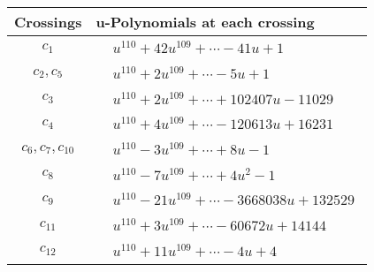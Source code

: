 \documentclass[1p]{elsarticle_modified}
\theoremstyle{definition}
\begin{document}
\begin{tabular}{m{50pt}|m{274pt}}
Crossings & \hspace{64pt}u-Polynomials at each crossing \\
\hline $$\begin{aligned}c_{1}\end{aligned}$$&$\begin{aligned}
&u^{110}+42 u^{109}+\cdots-41 u+1
\end{aligned}$\\
\hline $$\begin{aligned}c_{2},c_{5}\end{aligned}$$&$\begin{aligned}
&u^{110}+2 u^{109}+\cdots-5 u+1
\end{aligned}$\\
\hline $$\begin{aligned}c_{3}\end{aligned}$$&$\begin{aligned}
&u^{110}+2 u^{109}+\cdots+102407 u-11029
\end{aligned}$\\
\hline $$\begin{aligned}c_{4}\end{aligned}$$&$\begin{aligned}
&u^{110}+4 u^{109}+\cdots-120613 u+16231
\end{aligned}$\\
\hline $$\begin{aligned}c_{6},c_{7},c_{10}\end{aligned}$$&$\begin{aligned}
&u^{110}-3 u^{109}+\cdots+8 u-1
\end{aligned}$\\
\hline $$\begin{aligned}c_{8}\end{aligned}$$&$\begin{aligned}
&u^{110}-7 u^{109}+\cdots+4 u^2-1
\end{aligned}$\\
\hline $$\begin{aligned}c_{9}\end{aligned}$$&$\begin{aligned}
&u^{110}-21 u^{109}+\cdots-3668038 u+132529
\end{aligned}$\\
\hline $$\begin{aligned}c_{11}\end{aligned}$$&$\begin{aligned}
&u^{110}+3 u^{109}+\cdots-60672 u+14144
\end{aligned}$\\
\hline $$\begin{aligned}c_{12}\end{aligned}$$&$\begin{aligned}
&u^{110}+11 u^{109}+\cdots-4 u+4
\end{aligned}$\\
\hline
\end{tabular}\\~\\
\end{document}
